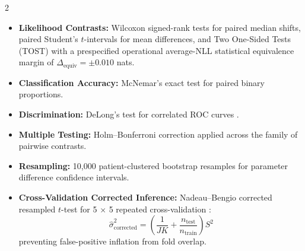 \documentclass[10pt,a4paper,twoside]{article}
\begin{document}
\begin{multicols}{2}
\begin{itemize}
  \setlength{\itemsep}{1pt}
  \item \textbf{Likelihood Contrasts:} Wilcoxon signed-rank tests for paired median shifts, paired Student's $t$-intervals for mean differences, and Two One-Sided Tests (TOST) with a prespecified operational average-NLL statistical equivalence margin of $\Delta_{\text{equiv}} = \pm 0.010$ nats.
  \item \textbf{Classification Accuracy:} McNemar's exact test for paired binary proportions.
  \item \textbf{Discrimination:} DeLong's test for correlated ROC curves \cite{delong1988}.
  \item \textbf{Multiple Testing:} Holm--Bonferroni correction applied across the family of pairwise contrasts.
  \item \textbf{Resampling:} 10,000 patient-clustered bootstrap resamples for parameter difference confidence intervals.
  \item \textbf{Cross-Validation Corrected Inference:} Nadeau--Bengio corrected resampled $t$-test for 5 $\times$ 5 repeated cross-validation \cite{nadeau2003}:
  \begin{equation}
  \hat{\sigma}^2_{\text{corrected}} = \left(\frac{1}{JK} + \frac{n_{\text{test}}}{n_{\text{train}}}\right) S^2
  \end{equation}
  preventing false-positive inflation from fold overlap.
\end{itemize}


\end{multicols}
\end{document}
